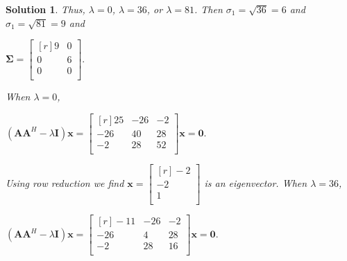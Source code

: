 \documentclass{article}
\newtheorem*{solution}{Solution}
\begin{document}
\begin{solution}
    Thus, $\lambda = 0$, $\lambda = 36$, or $\lambda = 81$. Then $\sigma_1 = \sqrt{36} = 6$
    and $\sigma_1 = \sqrt{81} = 9$ and 

    \begin{center}
        \begin{math}
            \mathbf{\Sigma} = 
                \begin{bmatrix*}[r]
                    9 & 0 \\
                    0 & 6 \\
                    0 & 0 \\ 
                \end{bmatrix*}.
        \end{math}
    \end{center}

    When $\lambda = 0$,
    
    \begin{center}
        \begin{math}
            (\mathbf{A}\mathbf{A}^{H} - \lambda\mathbf{I})\mathbf{x} = 
                \begin{bmatrix*}[r]
                    25 & -26 & -2 \\
                    -26 & 40 & 28 \\
                    -2 & 28 & 52 \\ 
                \end{bmatrix*} \mathbf{x}
                =\mathbf{0}.
        \end{math}
    \end{center}

    Using row reduction we find $\mathbf{x} =     
    \begin{bmatrix*}[r]
        -2 \\
        -2 \\
        1 \\
    \end{bmatrix*}$ is an eigenvector. When $\lambda = 36$,
    
    \begin{center}
        \begin{math}
            (\mathbf{A}\mathbf{A}^{H} - \lambda\mathbf{I})\mathbf{x} = 
                \begin{bmatrix*}[r]
                    -11 & -26 & -2 \\
                    -26 & 4 & 28 \\
                    -2 & 28 & 16 \\ 
                \end{bmatrix*} \mathbf{x}
                =\mathbf{0}.
        \end{math}
    \end{center}


\end{solution}
\end{document}
